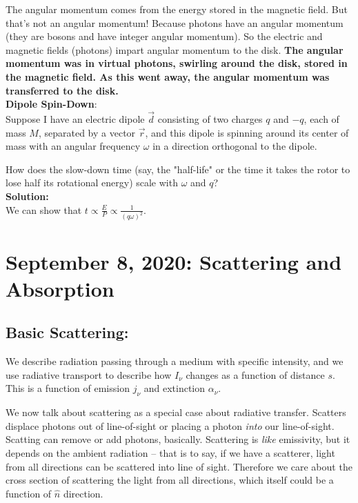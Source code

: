 \documentclass{article}
\begin{document}
The angular momentum comes from the energy stored in the magnetic field. But that's not an angular momentum! Because photons have an angular momentum (they are bosons and have integer angular momentum). So the electric and magnetic fields (photons) impart angular momentum to the disk. \textbf{The angular momentum was in virtual photons, swirling around the disk, stored in the magnetic field. As this went away, the angular momentum was transferred to the disk.}\\

\textbf{Dipole Spin-Down}:\\

Suppose I have an electric dipole $\vec d$ consisting of two charges $q$ and $-q$, each of mass $M$, separated by a vector $\vec r$, and this dipole is spinning around its center of mass with an angular frequency $\omega$ in a direction orthogonal to the dipole.

How does the slow-down time (say, the "half-life" or the time it takes the rotor to lose half its rotational energy) scale with $\omega$ and $q$?\\

\textbf{Solution:}\\

We can show that $t \propto \frac{E}{P} \propto \frac{1}{(q\omega)^2}$.

\newpage
\section{September 8, 2020: Scattering and Absorption}

\subsection{Basic Scattering:}

We describe radiation passing through a medium with specific intensity, and we use radiative transport to describe how $I_\nu$ changes as a function of distance $s$. This is a function of emission $j_\nu$ and extinction $\alpha_\nu$. 

We now talk about scattering as a special case about radiative transfer. Scatters displace photons out of line-of-sight or placing a photon \textit{into} our line-of-sight. Scatting can remove or add photons, basically. Scattering is \textit{like} emissivity, but it depends on the ambient radiation -- that is to say, if we have a scatterer, light from all directions can be scattered into line of sight. Therefore we care about the cross section of scattering the light from all directions, which itself could be a function of $\hat{n}$ direction.
\end{document}
